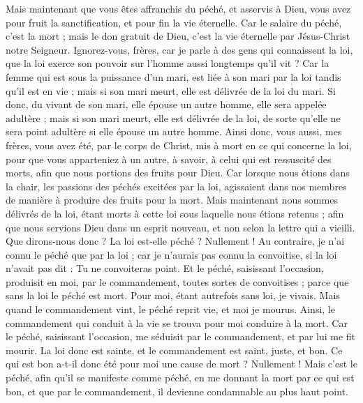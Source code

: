 \begin{multicols}{2}
Mais maintenant que vous êtes affranchis du péché, et asservis à Dieu, vous avez pour fruit la sanctification, et pour fin la vie éternelle.
Car le salaire du péché, c'est la mort ; mais le don gratuit de Dieu, c'est la vie éternelle par Jésus-Christ notre Seigneur.
\VerseOne{}Ignorez-vous, frères, car je parle à des gens qui connaissent la loi, que la loi exerce son pouvoir sur l’homme aussi longtemps qu’il vit ?
Car la femme qui est sous la puissance d'un mari, est liée à son mari par la loi tandis qu'il est en vie ; mais si son mari meurt, elle est délivrée de la loi du mari.
Si donc, du vivant de son mari, elle épouse un autre homme, elle sera appelée adultère ; mais si son mari meurt, elle est délivrée de la loi, de sorte qu'elle ne sera point adultère si elle épouse un autre homme.
Ainsi donc, vous aussi, mes frères, vous avez été, par le corps de Christ, mis à mort en ce qui concerne la loi, pour que vous apparteniez à un autre, à savoir, à celui qui est ressuscité des morts, afin que nous portions des fruits pour Dieu.
Car lorsque nous étions dans la chair, les passions des péchés excitées par la loi, agissaient dans nos membres de manière à produire des fruits pour la mort.
Mais maintenant nous sommes délivrés de la loi, étant morts à cette loi sous laquelle nous étions retenus ; afin que nous servions Dieu dans un esprit nouveau, et non selon la lettre qui a vieilli.
Que dirons-nous donc ? La loi est-elle péché ? Nullement ! Au contraire, je n'ai connu le péché que par la loi ; car je n’aurais pas connu la convoitise, si la loi n’avait pas dit : Tu ne convoiteras point.
Et le péché, saisissant l’occasion, produisit en moi, par le commandement, toutes sortes de convoitises ; parce que sans la loi le péché est mort.
Pour moi, étant autrefois sans loi, je vivais. Mais quand le commandement vint, le péché reprit vie, et moi je mourus.
Ainsi, le commandement qui conduit à la vie se trouva pour moi conduire à la mort.
Car le péché, saisissant l’occasion, me séduisit par le commandement, et par lui me fit mourir.
La loi donc est sainte, et le commandement est saint, juste, et bon.
Ce qui est bon a-t-il donc été pour moi une cause de mort ? Nullement ! Mais c’est le péché, afin qu'il se manifeste comme péché, en me donnant la mort par ce qui est bon, et que par le commandement, il devienne condamnable au plus haut point.

\end{multicols}
